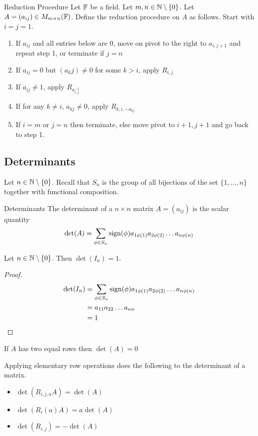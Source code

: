 \documentclass[a4paper]{article}
\begin{document}
\begin{defn}{Reduction Procedure}{} Let $\mathbb{F}$ be a field. Let $m,n\in\mathbb{N}\setminus\{0\}$. Let $A=(a_{ij})\in M_{m\times n}(\mathbb{F})$. Define the reduction procedure on $A$ as follows. Start with $i=j=1$. 
\begin{enumerate}
\item If $a_{ij}$ and all entries below are $0$, move on pivot to the right to $a_{i,j+1}$ and repeat step 1, or terminate if $j=n$
\item If $a_{ij}=0$ but $(a_kj)\neq 0$ for some $k>i$, apply $R_{i,j}$
\item If $a_{ij}\neq 1$, apply $R_{a_{i,j}^{-1}}$
\item If for any $k\neq i$, $a_{kj}\neq 0$, apply $R_{k,i,-a_{kj}}$
\item If $i=m$ or $j=n$ then terminate, else move pivot to $i+1,j+1$ and go back to step 1. 
\end{enumerate}
\end{defn}

\subsection{Determinants}
Let $n\in\mathbb{N}\setminus\{0\}$. Recall that $S_n$ is the group of all bijections of the set $\{1,\dots,n\}$ together with functional composition. 

\begin{defn}{Determinants}{} The determinant of a $n\times n$ matrix $A=(a_{ij})$ is the scalar quantity $$\det(A)=\sum_{\phi\in S_n}\operatorname{sign}(\phi)a_{1\phi(1)}a_{2\phi(2)}\dots a_{n\phi(n)}$$
\end{defn}

\begin{lmm}{}{} Let $n\in\mathbb{N}\setminus\{0\}$. Then $\det(I_n)=1$. \tcbline
\begin{proof} 
\begin{align*}
\det(I_n)&=\sum_{\phi\in S_n}\operatorname{sign}(\phi)a_{1\phi(1)}a_{2\phi(2)}\dots a_{n\phi(n)}\\
&=a_{11}a_{22}\dots a_{nn}\\
&=1
\end{align*}
\end{proof} 
\end{lmm}

\begin{prp}{}{} If $A$ has two equal rows then $\det(A)=0$
\end{prp}

\begin{prp}{}{} Applying elementary row operations does the following to the determinant of a matrix. 
\begin{itemize}
\item $\det(R_{i,j,a}A)=\det(A)$
\item $\det(R_{i}(a)A)=a\det(A)$
\item $\det(R_{i,j})=-\det(A)$
\end{itemize}
\end{prp}
\end{document}
